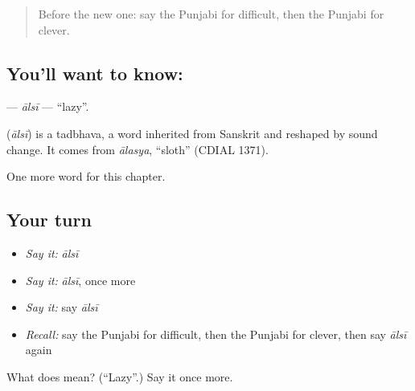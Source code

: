 \begin{quote}
Before the new one: say the Punjabi for difficult, then the Punjabi for clever.
\end{quote}

\subsection*{You'll want to know: }
\textbf{} — \emph{ālsī} — \textquotedblleft{}lazy\textquotedblright{}.

\begin{cousinweb}
\textbf{} (\emph{ālsī}) is a tadbhava, a word inherited from Sanskrit and reshaped by sound change. It comes from \emph{ālasya}, \textquotedblleft{}sloth\textquotedblright{} (CDIAL 1371).
\end{cousinweb}

\begin{grammarlens}[title={What you've built}]
One more word for this chapter.
\end{grammarlens}

\subsection*{Your turn}
\begin{itemize}
\raggedright
  \item \emph{Say it:} \emph{ālsī}
  \item \emph{Say it:} \emph{ālsī}, once more
  \item \emph{Say it:} say \emph{ālsī}
  \item \emph{Recall:} say the Punjabi for difficult, then the Punjabi for clever, then say \emph{ālsī} again
\end{itemize}

\begin{tcolorbox}[breakable,colback=teal!4,colframe=teal!35!black,title={Before you move on}]
What does  mean? (\textquotedblleft{}Lazy\textquotedblright{}.) Say it once more.
\end{tcolorbox}
